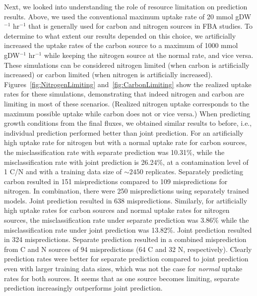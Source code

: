 \documentclass[12pt]{article}
\begin{document}
Next, we looked into understanding the role of resource limitation on prediction results. Above, we used the conventional maximum uptake rate of 20 mmol gDW$^{-1}$ hr$^{-1}$ that is generally used for carbon and nitrogen sources in FBA studies. To determine to what extent our results depended on this choice, we artificially increased the uptake rates of the carbon source to a maximum of 1000 mmol gDW$^{-1}$ hr$^{-1}$ while keeping the nitrogen source at the normal rate, and vice versa. These simulations can be considered nitrogen limited (when carbon is artificially increased) or carbon limited (when nitrogen is artificially increased). Figures~\ref{fig:NitrogenLimiting} and~\ref{fig:CarbonLimiting} show the realized uptake rates for these simulations, demonstrating that indeed nitrogen and carbon are limiting in most of these scenarios. (Realized nitrogen uptake corresponds to the maximum possible uptake while carbon does not or vice versa.) When predicting growth conditions from the final fluxes, we obtained similar results to before, i.e., individual prediction performed better than joint prediction. For an artificially high uptake rate for nitrogen but with a normal uptake rate for carbon sources, the misclassification rate with separate prediction was 10.31\%, while the  misclassification rate with joint prediction is 26.24\%, at a contamination level of 1 C/N and with a training data size of $\mathord{\sim}2450$ replicates. Separately predicting carbon resulted in 151 mispredictions compared to 109 mispredictions for nitrogen. In combination, there were 250 mispredictions using separately trained models. Joint prediction resulted in 638 mispredictions. Similarly, for artificially high uptake rates for carbon sources and normal uptake rates for nitrogen sources, the misclassification rate under separate prediction was 3.86\% while the misclassification rate under joint prediction was 13.82\%. Joint prediction resulted in 324 mispredictions. Separate prediction resulted in a combined misprediction from C and N sources of 94 mispredictions (64 C and 32 N, respectively). Clearly prediction rates were better for separate prediction compared to joint prediction even with larger training data sizes, which was not the case for \emph{normal} uptake rates for both sources. It seems that as one source becomes limiting, separate prediction increasingly outperforms joint prediction.
\end{document}

